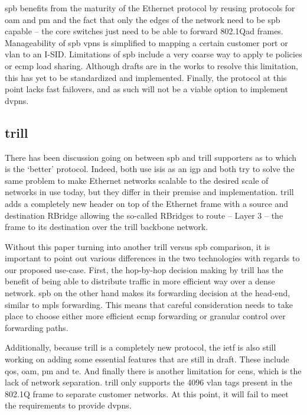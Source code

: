 \ac{spb} benefits from the maturity of the Ethernet protocol by reusing protocols for \ac{oam} and \ac{pm} and the fact that only the edges of the network need to be \ac{spb} capable -- the core switches just need to be able to forward 802.1Qad frames. Manageability of \ac{spb} \acp{vpn} is simplified to mapping a certain customer port or \ac{vlan} to an I-SID. Limitations of \ac{spb} include a very coarse way to apply \ac{te} policies or \ac{ecmp} load sharing. Although drafts are in the works to resolve this limitation, this has yet to be standardized and implemented. Finally, the protocol at this point lacks fast failovers, and as such will not be a viable option to implement \acp{dvpn}.



\subsection{\acs{trill}} %
\label{sub:trill}
There has been discussion going on between \ac{spb} and \ac{trill} supporters as to which is the `better' protocol. Indeed, both use \ac{isis} as an \ac{igp} and both try to solve the same problem to make Ethernet networks scalable to the desired scale of networks in use today, but they differ in their premise and implementation. \ac{trill} adds a completely new header on top of  the Ethernet frame with a source and destination RBridge allowing the so-called RBridges to route -- Layer 3 -- the frame to its destination over the \ac{trill} backbone network.

Without this paper turning into another \ac{trill} versus \ac{spb} comparison, it is important to point out various differences in the two technologies with regards to our proposed use-case. First, the hop-by-hop decision making by \ac{trill} has the benefit of being able to distribute traffic in more efficient way over a dense network. \ac{spb} on the other hand makes its forwarding decision at the head-end, similar to \ac{mpls} forwarding. This means that careful consideration needs to take place to choose either more efficient \ac{ecmp} forwarding or granular control over forwarding paths. 

Additionally, because \ac{trill} is a completely new protocol, the \ac{ietf} is also still working on adding some essential features that are still in draft. These include \ac{qos}, \ac{oam}, \ac{pm} and \ac{te}. And finally there is another limitation for \acp{cen}, which is the lack of network separation. \ac{trill} only supports the 4096 \ac{vlan} tags present in the 802.1Q frame to separate customer networks. At this point, it will fail to meet the requirements to provide \acp{dvpn}.

